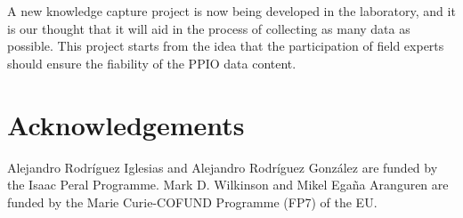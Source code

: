 \documentclass[sw]{iosart2c}
\begin{document}
A new knowledge capture project is now being developed in the laboratory, and it is our thought that it will aid in the process of collecting as many data as possible. This project starts from the idea that the participation of field experts should ensure the fiability of the PPIO data content.

\section*{Acknowledgements}
Alejandro Rodr\'iguez Iglesias and Alejandro Rodr\'iguez Gonz\'alez are funded by the Isaac Peral Programme. Mark D. Wilkinson and Mikel Ega\~na Aranguren are funded by the Marie Curie-COFUND Programme (FP7) of the EU.











  
\end{document}
